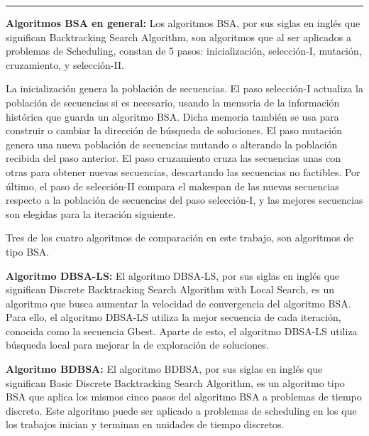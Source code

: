 \documentclass{article}
\begin{document}
\noindent\noindent
\rule{\linewidth}{0.4pt}

\vspace{\baselineskip}
\textbf{Algoritmos BSA en general:} Los algoritmos BSA, por sus siglas en inglés que significan Backtracking Search Algorithm, son algoritmos que al ser aplicados a problemas de Scheduling, constan de 5 pasos: inicialización, selección-I, mutación, cruzamiento, y selección-II. \autocite{modFMMSP}

\vspace{\baselineskip}
La inicialización genera la población de secuencias. El paso selección-I actualiza la población de secuencias si es necesario, usando la memoria de la información histórica que guarda un algoritmo BSA. Dicha memoria también se usa para construir o cambiar la dirección de búsqueda de soluciones. El paso mutación genera una nueva población de secuencias mutando o alterando la población recibida del paso anterior. El paso cruzamiento cruza las secuencias unas con otras para obtener nuevas secuencias, descartando las secuencias no factibles. Por último, el paso de selección-II compara el makespan de las nuevas secuencias respecto a la población de secuencias del paso selección-I, y las mejores secuencias son elegidas para la iteración siguiente. \autocite{modFMMSP}

\vspace{\baselineskip}
Tres de los cuatro algoritmos de comparación en este trabajo, son algoritmos de tipo BSA.

\vspace{\baselineskip}
\textbf{Algoritmo DBSA-LS:} El algoritmo DBSA-LS, por sus siglas en inglés que significan Discrete Backtracking Search Algorithm with Local Search, es un algoritmo que busca aumentar la velocidad de convergencia del algoritmo BSA. Para ello, el algoritmo DBSA-LS utiliza la mejor secuencia de cada iteración, conocida como la secuencia Gbest. Aparte de esto, el algoritmo DBSA-LS utiliza búsqueda local para mejorar la de exploración de soluciones. \autocite{modFMMSP}

\vspace{\baselineskip}
\textbf{Algoritmo BDBSA:} El algoritmo BDBSA, por sus siglas en inglés que significan Basic Discrete Backtracking Search Algorithm, es un algoritmo tipo BSA que aplica los mismos cinco pasos del algoritmo BSA a problemas de tiempo discreto. Este algoritmo puede ser aplicado a problemas de scheduling en los que los trabajos inician y terminan en unidades de tiempo discretos. \autocite{modFMMSP}
\end{document}
